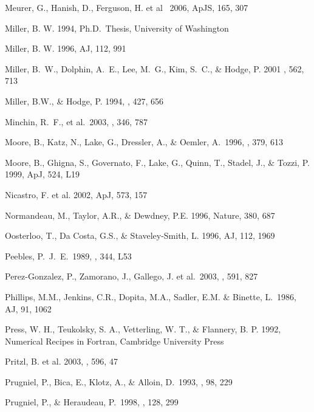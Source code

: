 \documentclass[preprint]{aastex}
\begin{document}
\begin{thebibliography}{}
Meurer, G., Hanish, D., Ferguson, H. et al \ 2006, ApJS, 165, 307 

Miller, B. W. 1994, Ph.D.\ Thesis, University of Washington

Miller, B. W. 1996, AJ, 112, 991 

Miller, B.~W., Dolphin, A.~E., Lee, M.~G., Kim, S.~C., \& Hodge, P. 2001
\apj , 562, 713

Miller, B.W., \& Hodge, P. 1994, \apj , 427, 656

Minchin, R.~F., et al.\ 2003, \mnras, 346, 787 

Moore, B., Katz, N., Lake, G., Dressler, A., \& Oemler, A.\ 1996, \nat, 379, 613 

Moore, B., Ghigna, S., Governato, F., Lake, G., Quinn, T., Stadel, J., \&
Tozzi, P. 1999, ApJ, 524, L19

Nicastro, F. et al. 2002, ApJ, 573, 157

Normandeau, M., Taylor, A.R., \& Dewdney, P.E. 1996, Nature, 380, 687

Oosterloo, T., Da Costa, G.S., \& Staveley-Smith, L. 1996, AJ, 112, 1969

Peebles, P.~J.~E.\ 1989, \apjl, 344, L53 

Perez-Gonzalez, P., Zamorano, J., Gallego, J. et al.\ 2003, \apj, 591, 827 

Phillips, M.M., Jenkins, C.R., Dopita, M.A., Sadler, E.M. \& Binette, L.\ 1986, AJ, 91, 1062

Press, W. H., Teukolsky, S. A., Vetterling, W. T., \& Flannery, B. P. 1992,
Numerical Recipes in Fortran, Cambridge University Press

Pritzl, B. et al. 2003, \apj, 596, 47

Prugniel, P., Bica, E., Klotz, A., \& Alloin, D.\ 1993, \aaps, 98, 229 

Prugniel, P., \& Heraudeau, P.\ 1998, \aaps, 128, 299 


\end{thebibliography}
\end{document}
